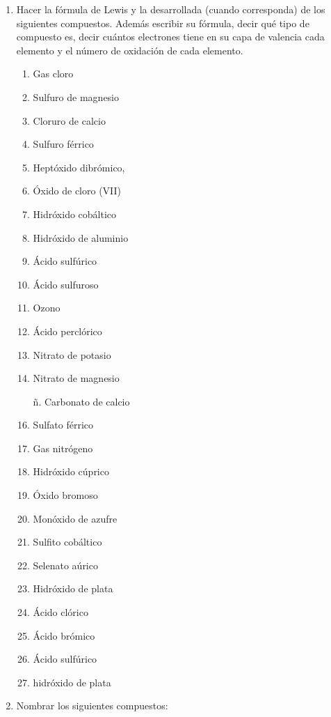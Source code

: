 \begin{enumerate}
\item Hacer la fórmula de Lewis y la desarrollada (cuando corresponda) de los siguientes compuestos. Además escribir su fórmula, decir qué tipo de compuesto es, decir cuántos electrones tiene en su capa de valencia cada elemento y el número de oxidación de cada elemento.

\begin{multicols}{3}
\begin{enumerate}
    \item Gas cloro
    \item Sulfuro de magnesio
    \item Cloruro de calcio
    \item Sulfuro férrico
    \item Heptóxido dibrómico, 
    \item Óxido de cloro (VII)
    \item Hidróxido cobáltico
    \item Hidróxido de aluminio
    \item Ácido sulfúrico
    \item Ácido sulfuroso
    \item Ozono
    \item Ácido perclórico
    \item Nitrato de potasio
    \item Nitrato de magnesio
    \item[ñ.] Carbonato de calcio
    \item Sulfato férrico
    \item Gas nitrógeno
    \item Hidróxido cúprico
    \item Óxido bromoso
    \item Monóxido de azufre
    \item Sulfito cobáltico
    \item Selenato aúrico
    \item Hidróxido de plata
    \item Ácido clórico
    \item Ácido brómico
    \item Ácido sulfúrico
    \item hidróxido de plata    
\end{enumerate}
\end{multicols}


\item Nombrar los siguientes compuestos:


\end{enumerate}
